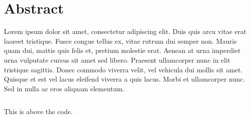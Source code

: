
\chapter*{Abstract}

 Lorem ipsum dolor sit amet, consectetur adipiscing elit. Duis quis arcu vitae erat laoreet tristique. Fusce congue tellus ex, vitae rutrum dui semper non. Mauris quam dui, mattis quis felis et, pretium molestie erat. Aenean at urna imperdiet urna vulputate cursus sit amet sed libero. Praesent ullamcorper nunc in elit tristique sagittis. Donec commodo viverra velit, vel vehicula dui mollis sit amet. Quisque et est vel lacus eleifend viverra a quis lacus. Morbi et ullamcorper nunc. Sed in nulla ac eros aliquam elementum.
 
\begin{listing}[ht]
     \inputminted{python}{technicalreport/listing/test.py}
     \caption{This is above the code.}
     \label{lst:the-code}
\end{listing}